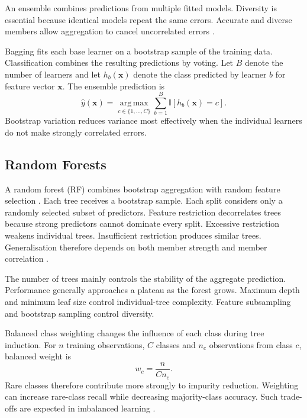 \documentclass[conference]{IEEEtran}
\begin{document}
An ensemble combines predictions from multiple fitted models. Diversity is essential because identical models repeat the same errors. Accurate and diverse members allow aggregation to cancel uncorrelated errors \cite{dietterich2000ensemble}.

Bagging fits each base learner on a bootstrap sample of the training data. Classification combines the resulting predictions by voting. Let $B$ denote the number of learners and let $h_b(\boldsymbol{x})$ denote the class predicted by learner $b$ for feature vector $\boldsymbol{x}$. The ensemble prediction is
\begin{equation}
\hat{y}(\boldsymbol{x})=\underset{c\in\{1,\ldots,C\}}{\operatorname{arg\,max}}
\sum_{b=1}^{B}\mathbb{I}\left[h_b(\boldsymbol{x})=c\right].
\label{eq:vote}
\end{equation}
Bootstrap variation reduces variance most effectively when the individual learners do not make strongly correlated errors.

\subsection{Random Forests}

A random forest (RF) combines bootstrap aggregation with random feature selection \cite{breiman2001random}. Each tree receives a bootstrap sample. Each split considers only a randomly selected subset of predictors. Feature restriction decorrelates trees because strong predictors cannot dominate every split. Excessive restriction weakens individual trees. Insufficient restriction produces similar trees. Generalisation therefore depends on both member strength and member correlation \cite{breiman2001random}.

The number of trees mainly controls the stability of the aggregate prediction.  Performance generally approaches a plateau as the forest grows. Maximum depth and minimum leaf size control individual-tree complexity. Feature subsampling and bootstrap sampling control diversity.

Balanced class weighting changes the influence of each class during tree induction. For $n$ training observations, $C$ classes and $n_c$ observations from class $c$, balanced weight is
\begin{equation}
w_c=\frac{n}{C n_c}.
\label{eq:weight}
\end{equation}
Rare classes therefore contribute more strongly to impurity reduction. Weighting can increase rare-class recall while decreasing majority-class accuracy. Such trade-offs are expected in imbalanced learning \cite{he2009learning}.
\end{document}
